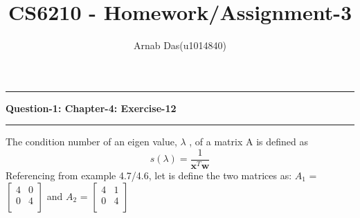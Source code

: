 \documentclass{article}
\title{CS6210 - Homework/Assignment-3}
\author{Arnab Das(u1014840)}
\newcommand\question[2]{\vspace{.25in}\hrule\textbf{#1: #2}\hrule\vspace{.10in}}
\begin{document}
  \maketitle
  \newpage
  \newcommand\NAME{ArNaB DaS}
  \newcommand\UID{uxxxxxxx}
  \newcommand\HWNUM{3}
  
   \question{Question-1}{Chapter-4: Exercise-12}
     The condition number of an eigen value, $\lambda$ , of a matrix A is defined as \newline
     \[ s(\lambda) = \dfrac{1}{\textbf {x}^T\textbf{w}}\] \newline
     Referencing from example 4.7/4.6, let is define the two matrices as: \newline
     $A_{1}$ = 
$\begin{bmatrix}
  4 & 0 \\
  0 &  4 \\
\end{bmatrix}$ and $A_{2}$ = 
$\begin{bmatrix}
 4 & 1 \\
 0 & 4 \\
\end{bmatrix}$ \newline
\end{document}
